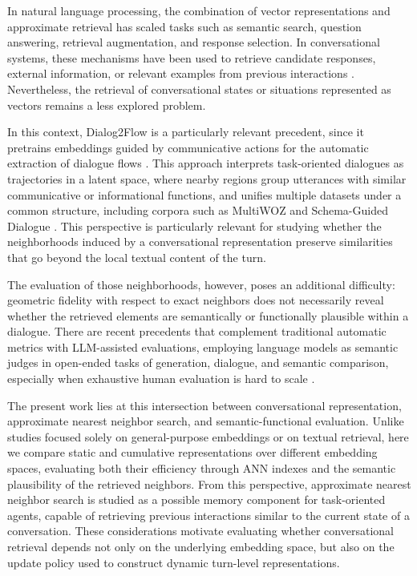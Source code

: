 \documentclass[runningheads]{llncs}
\begin{document}
In natural language processing, the combination of vector representations and approximate retrieval has scaled tasks such as semantic search, question answering, retrieval augmentation, and response selection. In conversational systems, these mechanisms have been used to retrieve candidate responses, external information, or relevant examples from previous interactions \cite{eric2017key,sahoo2022retrieval,raposo2023prompting}. Nevertheless, the retrieval of conversational states or situations represented as vectors remains a less explored problem.

In this context, Dialog2Flow is a particularly relevant precedent, since it pretrains embeddings guided by communicative actions for the automatic extraction of dialogue flows \cite{burdisso2024dialog2flow}. This approach interprets task-oriented dialogues as trajectories in a latent space, where nearby regions group utterances with similar communicative or informational functions, and unifies multiple datasets under a common structure, including corpora such as MultiWOZ \cite{budzianowski2018multiwoz,zang2020multiwoz22} and Schema-Guided Dialogue \cite{rastogi2020schema}. This perspective is particularly relevant for studying whether the neighborhoods induced by a conversational representation preserve similarities that go beyond the local textual content of the turn.

The evaluation of those neighborhoods, however, poses an additional difficulty: geometric fidelity with respect to exact neighbors does not necessarily reveal whether the retrieved elements are semantically or functionally plausible within a dialogue. There are recent precedents that complement traditional automatic metrics with LLM-assisted evaluations, employing language models as semantic judges in open-ended tasks of generation, dialogue, and semantic comparison, especially when exhaustive human evaluation is hard to scale \cite{liu2023geval,zheng2023judging}.

The present work lies at this intersection between conversational representation, approximate nearest neighbor search, and semantic-functional evaluation. Unlike studies focused solely on general-purpose embeddings or on textual retrieval, here we compare static and cumulative representations over different embedding spaces, evaluating both their efficiency through ANN indexes and the semantic plausibility of the retrieved neighbors. From this perspective, approximate nearest neighbor search is studied as a possible memory component for task-oriented agents, capable of retrieving previous interactions similar to the current state of a conversation. These considerations motivate evaluating whether conversational retrieval depends not only on the underlying embedding space, but also on the update policy used to construct dynamic turn-level representations.
\end{document}
